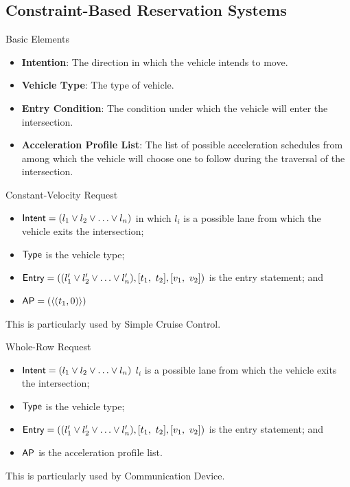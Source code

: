 \documentclass{beamer}
\begin{document}
\subsection{Constraint-Based Reservation Systems}

\begin{frame}{Basic Elements}
\begin{itemize}
\item{\bf Intention}: The direction in which the vehicle intends to
move.
\item{\bf Vehicle Type}: The type of vehicle.
\item{\bf Entry Condition}: The condition under which the vehicle will
enter the intersection.
\item{\bf Acceleration Profile List}: The list of possible
acceleration schedules from among which the vehicle will choose one to
follow during the traversal of the intersection.
\end{itemize}
\end{frame}

\begin{frame}{Constant-Velocity Request}
\begin{itemize}
\item ${\sf Intent} = ( l_1 \vee l_2 \vee \ldots \vee l_n )$
in which $l_i$ is a possible lane from which the vehicle 
exits the intersection;
\item ${\sf Type}$ is the vehicle type;
\item ${\sf Entry} = (( l'_1 \vee l'_2 \vee \ldots \vee l'_n ), [t_1,\ t_2], [v_1,\ v_2])$
is the entry statement; and
\item ${\sf AP} = ( \langle (t_1, 0) \rangle )$
\end{itemize}

This is particularly used by Simple Cruise Control.
\end{frame}

\begin{frame}{Whole-Row Request}
\begin{itemize}
\item ${\sf Intent} = ( l_1 \vee l_2 \vee \ldots \vee l_n )$ $l_i$ is a possible lane from which the vehicle exits the intersection;
\item ${\sf Type}$ is the vehicle type;
\item ${\sf Entry} = (( l'_1 \vee l'_2 \vee \ldots \vee l'_n ), [t_1,\ t_2], [v_1,\ v_2])$ is the entry statement; and
\item ${\sf AP}$ is the acceleration profile list.
\end{itemize}

This is particularly used by Communication Device.
\end{frame}
\end{document}
